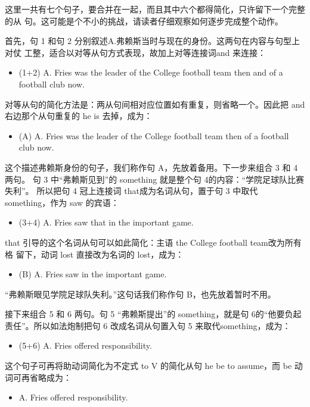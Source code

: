 这里一共有七个句子，要合并在一起，而且其中六个都得简化，只许留下一个完整的从
句。这可能是个不小的挑战，请读者仔细观察如何逐步完成整个动作。

首先，句 1 和句 2 分别叙述A.弗赖斯当时与现在的身份。这两句在内容与句型上对仗
工整，适合以对等从句方式表现，故加上对等连接词and 来连接：
\begin{itemize}
\item (1+2) A. Fries was the leader of the College football team then and
   of a football club now.
\end{itemize}
对等从句的简化方法是：两从句间相对应位置如有重复，则省略一个。因此把 and
右边那个从句重复的 he is 去掉，成为：
\begin{itemize}
\item (A) A. Fries was the leader of the College football team then  of a football club now.
\end{itemize}
这个描述弗赖斯身份的句子，我们称作句 A，先放着备用。下一步来组合 3 和 4两句。
句 3 中“弗赖斯见到”的 something 就是整个句 4的内容：“学院足球队比赛失利”。
所以把句 4 冠上连接词 that成为名词从句，置于句 3 中取代 something，作为 saw
的宾语：
\begin{itemize}
\item (3+4) A. Fries saw that  in the important
  game.
\end{itemize}
that 引导的这个名词从句可以如此简化：主语 the College football team改为所有格
留下，动词 lost 直接改为名词的 lost，成为：
\begin{itemize}
\item (B) A. Fries saw  in the important
  game.
\end{itemize}
“弗赖斯眼见学院足球队失利。”这句话我们称作句 B，也先放着暂时不用。

接下来组合 5 和 6 两句。句 5 “弗赖斯提出”的 something，就是句 6的“他要负起
责任”。所以如法炮制把句 6 改成名词从句置入句 5 来取代something，成为：
\begin{itemize}
\item (5+6) A. Fries offered  responsibility.
\end{itemize}
这个句子可再将助动词简化为不定式 to V 的简化从句 he be to assume，而 be
动词可再省略成为：
\begin{itemize}
\item A. Fries offered  responsibility.
\end{itemize}

